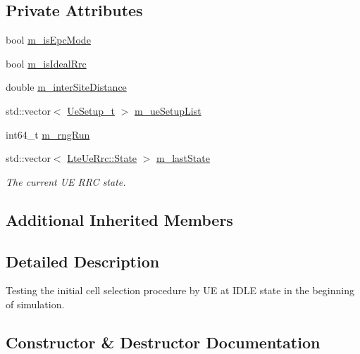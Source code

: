 \subsection*{Private Attributes}
\begin{DoxyCompactItemize}
\item 
bool \hyperlink{classLteCellSelectionTestCase_a6cbbe728191931290d41ef5ac4fb8b4b}{m\+\_\+is\+Epc\+Mode}
\item 
bool \hyperlink{classLteCellSelectionTestCase_adb806baf13b9fdbfbfe947baa5f45b2a}{m\+\_\+is\+Ideal\+Rrc}
\item 
double \hyperlink{classLteCellSelectionTestCase_a71bd16bea626b264efb219eaed8af84c}{m\+\_\+inter\+Site\+Distance}
\item 
std\+::vector$<$ \hyperlink{structLteCellSelectionTestCase_1_1UeSetup__t}{Ue\+Setup\+\_\+t} $>$ \hyperlink{classLteCellSelectionTestCase_a09e2b5bfbe6cd4fbd482dde48078a8c7}{m\+\_\+ue\+Setup\+List}
\item 
int64\+\_\+t \hyperlink{classLteCellSelectionTestCase_a97ba27e3f212deb47d94c92b5e96f2f6}{m\+\_\+rng\+Run}
\item 
std\+::vector$<$ \hyperlink{classns3_1_1LteUeRrc_a241012c291e75681150c9214e11f6145}{Lte\+Ue\+Rrc\+::\+State} $>$ \hyperlink{classLteCellSelectionTestCase_a1a501f3fc32e3ff1f46f0cbf326d2661}{m\+\_\+last\+State}
\begin{DoxyCompactList}\small\item\em The current UE R\+RC state. \end{DoxyCompactList}\end{DoxyCompactItemize}
\subsection*{Additional Inherited Members}


\subsection{Detailed Description}
Testing the initial cell selection procedure by UE at I\+D\+LE state in the beginning of simulation. 

\subsection{Constructor \& Destructor Documentation}
